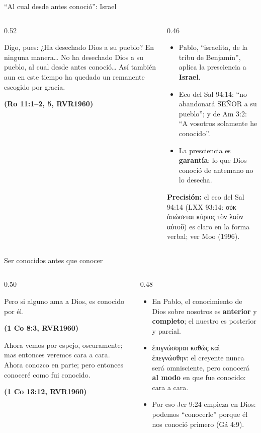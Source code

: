 \documentclass[hyperref={bookmarks=false},aspectratio=169]{beamer}
\newcommand{\grc}[1]{\foreignlanguage{ancientgreek}{#1}}
\newcommand{\SENOR}{S{\fontsize{0.78em}{1em}\selectfont EÑOR}}
\newcommand{\fuente}[1]{\par\hfill{\upshape\bfseries\footnotesize\textcolor{azul}{#1}}}
\newcommand{\destacar}[1]{\textbf{\textcolor{azul}{#1}}}
\newcommand{\precision}[1]{{\footnotesize\color{gris}\textbf{Precisión:} #1}}
\begin{document}
\begin{frame}{``Al cual desde antes conoció'': Israel}
\begin{columns}[t,onlytextwidth]
\begin{column}{0.52\textwidth}
\begin{cita}Digo, pues: ¿Ha desechado Dios a su pueblo? En ninguna manera\ldots{} No ha desechado Dios a su pueblo, al cual desde antes conoció\ldots{} Así también aun en este tiempo ha quedado un remanente escogido por gracia.\fuente{(Ro 11:1--2, 5, RVR1960)}\end{cita}
\end{column}
\begin{column}{0.46\textwidth}\small
\begin{itemize}
\item Pablo, ``israelita, de la tribu de Benjamín'', aplica la presciencia a \destacar{Israel}.
\item Eco del Sal 94:14: ``no abandonará \SENOR{} a su pueblo''; y de Am 3:2: ``A vosotros solamente he conocido''.
\item La presciencia es \destacar{garantía}: lo que Dios conoció de antemano no lo desecha.
\end{itemize}
\precision{el eco del Sal 94:14 (LXX 93:14: \grc{οὐκ ἀπώσεται κύριος τὸν λαὸν αὐτοῦ}) es claro en la forma verbal; ver Moo (1996).}
\end{column}
\end{columns}
\end{frame}

\begin{frame}{Ser conocidos antes que conocer}
\begin{columns}[t,onlytextwidth]
\begin{column}{0.50\textwidth}
\begin{cita}Pero si alguno ama a Dios, es conocido por él.\fuente{(1 Co 8:3, RVR1960)}\end{cita}
\begin{cita}Ahora vemos por espejo, oscuramente; mas entonces veremos cara a cara. Ahora conozco en parte; pero entonces conoceré como fui conocido.\fuente{(1 Co 13:12, RVR1960)}\end{cita}
\end{column}
\begin{column}{0.48\textwidth}\small
\begin{itemize}
\item En Pablo, el conocimiento de Dios sobre nosotros es \destacar{anterior} y \destacar{completo}; el nuestro es posterior y parcial.
\item \grc{ἐπιγνώσομαι καθὼς καὶ ἐπεγνώσθην}: el creyente nunca será omnisciente, pero conocerá \destacar{al modo} en que fue conocido: cara a cara.
\item Por eso Jer 9:24 empieza en Dios: podemos ``conocerle'' porque él nos conoció primero (Gá 4:9).
\end{itemize}
\end{column}
\end{columns}
\end{frame}
\end{document}
